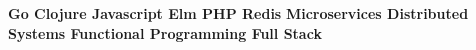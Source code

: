 

\begin{cvskills}

  \cvskill
    {} {\textbf{ Go \hspace{45pt}  Clojure \hspace{45pt} Javascript \hspace{45pt} Elm \hspace{45pt} PHP \hspace{45pt} Redis}}
   \cvskill
    {} {\textbf{ \hspace{15pt} Microservices \hspace{25pt} Distributed Systems \hspace{25pt}  Functional Programming  
        \hspace{25pt}Full Stack}}  

 

\end{cvskills}
